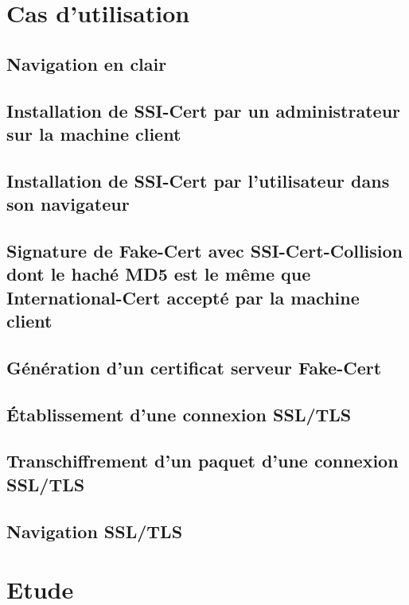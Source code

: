 \documentclass[a4paper,11pt,french]{article}
\begin{document}
\section{Cas d'utilisation}

\subsection{Navigation en clair}


\subsection{Installation de SSI-Cert par un administrateur sur la machine client}


\subsection{Installation de SSI-Cert par l'utilisateur dans son navigateur}


\subsection{Signature de Fake-Cert avec SSI-Cert-Collision dont le haché MD5 est le même que International-Cert accepté par la machine client }


\subsection{Génération d'un certificat serveur Fake-Cert}


\subsection{Établissement d'une connexion SSL/TLS}


\subsection{Transchiffrement d'un paquet d'une connexion SSL/TLS}


\subsection{Navigation SSL/TLS}


\section{Etude}
\end{document}
